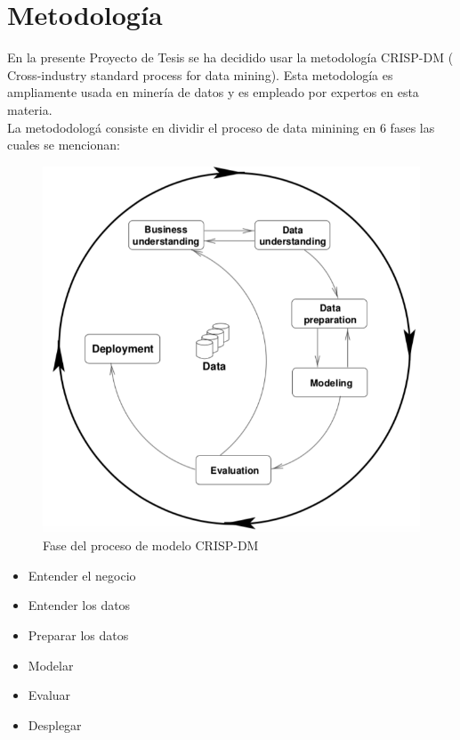 %
\chapter{Metodolog\'ia}

En la presente Proyecto de Tesis se ha decidido usar la metodolog\'ia  CRISP-DM ( Cross-industry standard process for data mining). Esta metodolog\'ia es ampliamente usada en miner\'ia de datos y es empleado por expertos en esta materia. \\

La metododolog\'a consiste en dividir el proceso de data minining en 6 fases las cuales se mencionan:



\begin{figure}[H]
\centering
\includegraphics[scale=0.4]{chapters/img/Ch06_CRISP.PNG}
\caption{Fase del proceso de modelo CRISP-DM}
\end{figure}

\begin{itemize}
\item Entender el negocio
\item Entender los datos
\item Preparar los datos
\item Modelar
\item Evaluar
\item Desplegar
\end{itemize}


